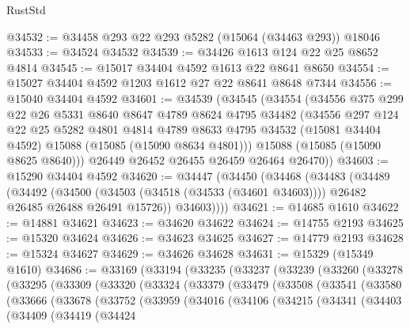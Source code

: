 \begin{lexlean}{RustStd}
\begin{coremodule}
@34532 := @34458 @293 @22 @293 @5282 (@15064 (@34463 @293)) @18046
@34533 := @34524 @34532
@34539 := @34426 @1613 @124 @22 @25 @8652 @4814
@34545 := @15017 @34404 @4592 @1613 @22 @8641 @8650
@34554 := @15027 @34404 @4592 @1203 @1612 @27 @22 @8641 @8648 @7344
@34556 := @15040 @34404 @4592
@34601 := @34539
    (@34545
      (@34554
        (@34556
          @375
          @299
          @22
          @26
          @5331
          @8640
          @8647
          @4789
          @8624
          @4795
          @34482
          (@34556
            @297
            @124
            @22
            @25
            @5282
            @4801
            @4814
            @4789
            @8633
            @4795
            @34532
            (@15081 @34404 @4592)
            @15088
            (@15085 (@15090 @8634 @4801)))
          @15088
          (@15085 (@15090 @8625 @8640)))
        @26449
        @26452
        @26455
        @26459
        @26464
        @26470))
@34603 := @15290 @34404 @4592
@34620 := @34447
    (@34450
      (@34468
        (@34483
          (@34489
            (@34492
              (@34500
                (@34503 (@34518 (@34533 (@34601 @34603))))
                @26482
                @26485
                @26488
                @26491
                @15726))
            @34603))))
@34621 := @14685 @1610
@34622 := @14881 @34621
@34623 := @34620 @34622
@34624 := @14755 @2193
@34625 := @15320 @34624
@34626 := @34623 @34625
@34627 := @14779 @2193
@34628 := @15324 @34627
@34629 := @34626 @34628
@34631 := @15329 (@15349 @1610)
@34686 := @33169
    (@33194
      (@33235
        (@33237
          (@33239
            (@33260
              (@33278
                (@33295
                  (@33309
                    (@33320
                      (@33324
                        (@33379
                          (@33479
                            (@33508
                              (@33541
                                (@33580
                                  (@33666
                                    (@33678
                                      (@33752
                                        (@33959
                                          (@34016
                                            (@34106
                                              (@34215
                                                (@34341
                                                  (@34403
                                                    (@34409
                                                      (@34419
                                                        (@34424

\end{coremodule}
\end{lexlean}
